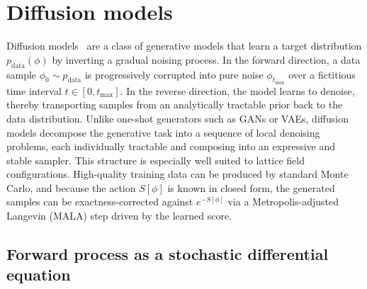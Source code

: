\documentclass[reprint,twocolumn,superscriptaddress,preprintnumbers,amsmath,amssymb,aps,prd,floatfix]{revtex4-2}
\newcommand{\gettitle}{}
\begin{document}
\title{\gettitle}
\author{Yang-yang Tan}


\author{Lingxiao Wang}


\author{...(to be added)...}

\date{\today}


\begin{abstract}
\end{abstract}


\maketitle


\section{Diffusion models}
\label{sec:dm_framework}

Diffusion models~\cite{Ho2020DDPM,Song2021SDE} are a class of generative models that learn a target distribution $p_{\text{data}}(\phi)$ by inverting a gradual noising process. In the forward direction, a data sample $\phi_0\sim p_{\text{data}}$ is progressively corrupted into pure noise $\phi_{t_{\max}}$ over a fictitious time interval $t\in[0,t_{\max}]$. In the reverse direction, the model learns to denoise, thereby transporting samples from an analytically tractable prior back to the data distribution. Unlike one-shot generators such as GANs or VAEs, diffusion models decompose the generative task into a sequence of local denoising problems, each individually tractable and composing into an expressive and stable sampler. This structure is especially well suited to lattice field configurations. High-quality training data can be produced by standard Monte Carlo, and because the action $S[\phi]$ is known in closed form, the generated samples can be exactness-corrected against $e^{-S[\phi]}$ via a Metropolis-adjusted Langevin (MALA) step driven by the learned score.

\subsection{Forward process as a stochastic differential equation}
\label{sec:dm_forward}
\end{document}
